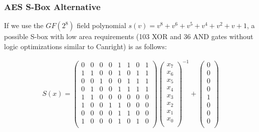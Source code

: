 \documentclass[handout,10pt]{beamer}
\begin{document}
\begin{frame}
	\frametitle{AES S-Box Alternative}
	If we use the $GF(2^8)$ field polynomial $s(v) = v^8 + v^6 + v^5 + v^4 + v^2 + v + 1$, a possible S-box with low area requirements (103 XOR and 36 AND gates without logic optimizations similar to Canright) is as follows:

\begin{align*}
S(x) =  
\begin{pmatrix}
0 & 0 & 0 & 0 & 1 & 1 & 0 & 1 \\
1 & 1 & 0 & 0 & 1 & 0 & 1 & 1 \\
0 & 0 & 1 & 0 & 0 & 1 & 1 & 1 \\
0 & 1 & 0 & 0 & 1 & 1 & 1 & 1 \\
1 & 1 & 0 & 0 & 0 & 0 & 0 & 0 \\
1 & 0 & 0 & 1 & 1 & 0 & 0 & 0 \\
0 & 0 & 0 & 0 & 1 & 1 & 0 & 0 \\
1 & 0 & 0 & 0 & 1 & 0 & 1 & 0 \\
\end{pmatrix}
\begin{pmatrix}
x_7 \\
x_6 \\
x_5 \\
x_4 \\
x_3 \\ 
x_2 \\
x_1 \\
x_0 \\
\end{pmatrix}^{-1}
+
\begin{pmatrix}
0 \\
0 \\
0 \\
0 \\
1 \\ 
0 \\
0 \\
0 \\
\end{pmatrix}
\end{align*}
\end{frame}
\end{document}
